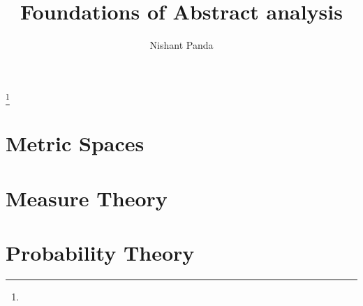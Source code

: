 \documentclass{gsm-l}
\begin{document}
\frontmatter

\title{Foundations of Abstract analysis}

\author{Nishant Panda}
\address{2451 S. Timberline Rd, Apt 4, Fort Collins, Co 80525}
\curraddr{}
\thanks{}



\maketitle
\setcounter{page}{5}
\tableofcontents

%

\mainmatter{}
\part{Metric Spaces}

\part{Measure Theory}





\part{Probability Theory}



\appendix


\backmatter{}
%
%

\printindex
\end{document}
